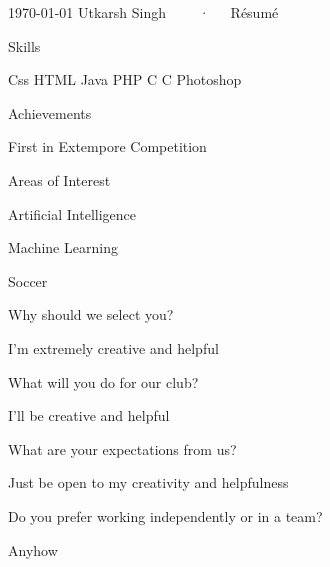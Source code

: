 \documentclass[11pt, a4paper]{awesome-cv}
\begin{document}
\makecvheader[C]

\makecvfooter
  {\today}
  {Utkarsh Singh ~~~~·~~~Résumé}
  {\thepage}



	\begin{cventries}
	\cventry
	{}{Skills}{}{}
	{
		\begin{cvitems}
		\item  Css HTML Java PHP C C Photoshop
		\end{cvitems}
	}

	\cventry
	{}{Achievements}{}{}
	{
		\begin{cvitems}
		\item First in Extempore Competition\item 
		\end{cvitems}
	}

	\cventry
	{}{Areas of Interest}{}{}
	{
		\begin{cvitems}
		\item Artificial Intelligence\item  Machine Learning\item  Soccer

		\end{cvitems}
	}

	\cventry
	{}{Why should we select you?}{}{}
	{
		\begin{cvitems}
		I'm extremely creative and helpful
		\end{cvitems}
	}

	\cventry
	{}{What will you do for our club?}{}{}
	{
		\begin{cvitems}
		I'll be creative and helpful
		\end{cvitems}
	}

	\cventry
	{}{What are your expectations from us?}{}{}
	{
		\begin{cvitems}
		Just be open to my creativity and helpfulness 

		\end{cvitems}
	}

	\cventry
	{}{Do you prefer working independently or in a team?}{}{}
	{
		\begin{cvitems}
		Anyhow

		\end{cvitems}
	}

	\end{cventries}
	



\end{document}
